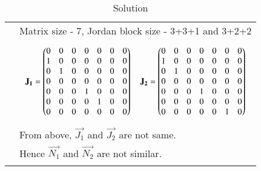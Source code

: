 \begin{longtable}{|p{5cm}|p{13cm}|}
& Matrix size - 7, Jordan block size - 3+3+1 and 3+2+2\\
& \parbox{10cm}{\begin{align}
    \mathbf{J_1} = \begin{pmatrix}0&0&0&0&0&0&0\\1&0&0&0&0&0&0\\0&1&0&0&0&0&0\\0&0&0&0&0&0&0\\0&0&0&1&0&0&0\\0&0&0&0&1&0&0\\0&0&0&0&0&0&0\end{pmatrix} \quad 
    \mathbf{J_2} = \begin{pmatrix}0&0&0&0&0&0&0\\1&0&0&0&0&0&0\\0&1&0&0&0&0&0\\0&0&0&0&0&0&0\\0&0&0&1&0&0&0\\0&0&0&0&0&0&0\\0&0&0&0&0&1&0\end{pmatrix} 
\end{align}}\\
& From above, $\vec{J_1}$ and $\vec{J_2}$ are not same.\\
&Hence $\vec{N_1}$ and $\vec{N_2}$ are not similar.\\
\hline
\caption{Solution}
\label{eq:solutions/7/3/11/table}
\end{longtable}

